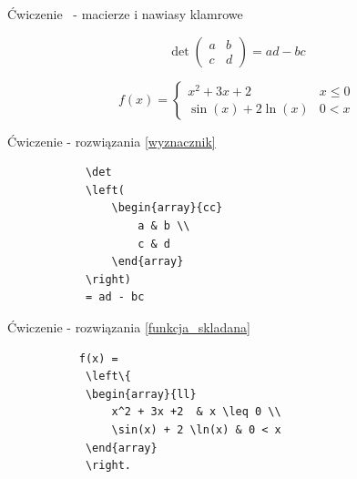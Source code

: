 \documentclass{beamer}
\theoremstyle{newblock}
\begin{document}
\begin{frame}[fragile]{Ćwiczenie \showmycounter \ - macierze i nawiasy klamrowe}
    \begin{examples}
        \begin{equation}
            \det
            \left(
                \begin{array}{cc}
                    a & b \\
                    c & d
                \end{array}
            \right)
            = ad - bc
            \label{wyznacznik}
        \end{equation}
    \end{examples}
    
    \begin{examples}
        \begin{equation}
           f(x) = 
            \left\{
            \begin{array}{ll}
                x^2 + 3x +2  & x \leq 0 \\
                \sin(x) + 2 \ln(x) & 0 < x
            \end{array}
            \right.
            \label{funkcja_skladana}
        \end{equation}
    \end{examples}
    
\end{frame}
\begin{frame}[fragile]{Ćwiczenie  - rozwiązania \eqref{wyznacznik} }
    \begin{examples}
        \begin{verbatim}
            \det
            \left(
                \begin{array}{cc}
                    a & b \\
                    c & d
                \end{array}
            \right)
            = ad - bc
        \end{verbatim}
    \end{examples}
    
\end{frame}

\begin{frame}[fragile]{Ćwiczenie  - rozwiązania \eqref{funkcja_skladana} }
    
    \begin{examples}        
        \begin{verbatim}
           f(x) = 
            \left\{
            \begin{array}{ll}
                x^2 + 3x +2  & x \leq 0 \\
                \sin(x) + 2 \ln(x) & 0 < x
            \end{array}
            \right.
        \end{verbatim}
    \end{examples}
    
\end{frame}
\end{document}
